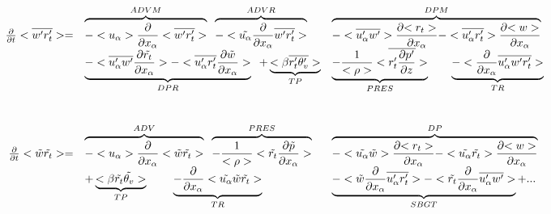 \begin{displaymath}
\left.
\begin{array}{rllll}
\frac{\partial }{\partial t} <\overline{w'r_t'}> = & 
\overbrace{- <u_\alpha>\frac{\partial}{\partial x_\alpha} <\overline{w'r_t'}> }^{ADVM} \;\;
\overbrace{- <\tilde{u_\alpha}\frac{\partial}{\partial x_\alpha} \overline{w'r_t'} > }^{ADVR} &
\overbrace{- <\overline{u_\alpha'w'}> \frac{\partial {<r_t>}}{\partial x_\alpha}
- <\overline{u'_\alpha r_t'}> \frac{\partial {<w>}}{\partial x_\alpha}}^{DPM} \\
\vspace*{1.0cm}
& \underbrace{- <\overline{u'_\alpha w'} \frac{\partial {\tilde{r_t}}}{\partial x_\alpha}>
- <\overline{u'_\alpha r_t'} \frac{\partial {\tilde{w}}}{\partial x_\alpha}>}_{DPR} \;\;
+ \underbrace{<\beta  \overline{r_t'\theta'_v}>}_{TP} &
\underbrace{- \frac{1}{<\rho>}<\overline{r_t' \frac{\partial p'}{\partial z}}>}_{PRES} \;\;\;\;\;\;\;
 \underbrace{- <\frac{\partial}{\partial x_\alpha} \overline{u'_\alpha w'r_t'}>}_{TR} \\
\frac{\partial }{\partial t} <\tilde{w}\tilde{r_t}> = & 
\overbrace{- <u_\alpha>\frac{\partial}{\partial x_\alpha} <\tilde{w}\tilde{r_t}> }^{ADV} \;\;
\overbrace{- \frac{1}{<\rho>}<\tilde{r_t} \frac{\partial \tilde{p}}{\partial x_\alpha}>}^{PRES} &
\overbrace{- <\tilde{u_\alpha} \tilde{w}> \frac{\partial {<r_t>}}{\partial x_\alpha}
- <\tilde{u_\alpha} \tilde{r_t}> \frac{\partial {<w>}}{\partial x_\alpha}}^{DP} &\\
&+ \underbrace{<\beta  \tilde{r_t}\tilde{\theta_v}>}_{TP} \;\;\;\;\;\;\;\;
 \underbrace{- \frac{\partial}{\partial x_\alpha} <\tilde{u_\alpha} \tilde{w}\tilde{r_t}>}_{TR} &
\underbrace{- <\tilde{w}\frac{\partial}{\partial x_\alpha}\overline{u'_\alpha r_t'}>
- <\tilde{r_t}\frac{\partial}{\partial x_\alpha}\overline{u'_\alpha w'}>}_{SBGT}  + ...&
\end{array}
\right.
\end{displaymath}

